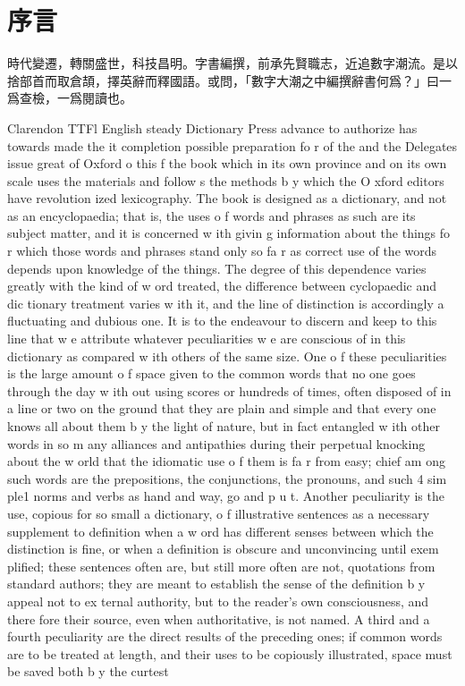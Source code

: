 {}
\chapter*{序言}

\indent 

時代變遷，轉關盛世，科技昌明。字書編撰，前承先賢職志，近追數字潮流。是以捨部首而取\textsf{倉頡}，擇\textsf{英}辭而釋國語。或問，「數字大潮之中編撰辭書何爲？」曰一爲查檢，一爲閱讀也。

 Clarendon TTFl English steady Dictionary Press advance to authorize has towards made the it completion possible preparation fo r of the and the Delegates issue great of Oxford
 o this f the book which in its own province and on its own scale uses the materials and
follow s the methods b y which the O xford editors have revolution­
ized lexicography. The book is designed as a dictionary, and not
as an encyclopaedia; that is, the uses o f words and phrases as such
are its subject matter, and it is concerned w ith givin g information
about the things fo r which those words and phrases stand only so
fa r as correct use of the words depends upon knowledge of the
things. The degree of this dependence varies greatly with the
kind of w ord treated, the difference between cyclopaedic and dic­
tionary treatment varies w ith it, and the line of distinction is
accordingly a fluctuating and dubious one. It is to the endeavour to
discern and keep to this line that w e attribute whatever peculiarities
w e are conscious of in this dictionary as compared w ith others of the
same size. One o f these peculiarities is the large amount o f space
given to the common words that no one goes through the day w ith­
out using scores or hundreds of times, often disposed of in a line or
two on the ground that they are plain and simple and that every one
knows all about them b y the light of nature, but in fact entangled
w ith other words in so m any alliances and antipathies during their
perpetual knocking about the w orld that the idiomatic use o f them
is fa r from easy; chief am ong such words are the prepositions, the
conjunctions, the pronouns, and such 4 sim ple1 norms and verbs as
hand and way, go and p u t. Another peculiarity is the use, copious
for so small a dictionary, o f illustrative sentences as a necessary
supplement to definition when a w ord has different senses between
which the distinction is fine, or when a definition is obscure and
unconvincing until exem plified; these sentences often are, but still
more often are not, quotations from standard authors; they are
meant to establish the sense of the definition b y appeal not to ex­
ternal authority, but to the reader’s own consciousness, and there­
fore their source, even when authoritative, is not named. A third
and a fourth peculiarity are the direct results of the preceding ones;
if common words are to be treated at length, and their uses to be
copiously illustrated, space must be saved both b y the curtest
